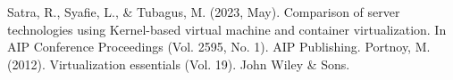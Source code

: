 \documentclass[12pt]{article}
\begin{document}
\begin{thebibliography}
     Satra, R., Syafie, L., & Tubagus, M. (2023, May). Comparison of server technologies using Kernel-based virtual machine and container virtualization. In AIP Conference Proceedings (Vol. 2595, No. 1). AIP Publishing.
     Portnoy, M. (2012). Virtualization essentials (Vol. 19). John Wiley & Sons.
\end{thebibliography}
\end{document}

